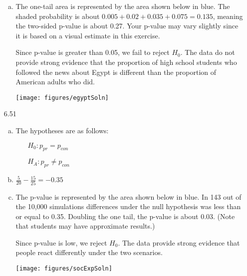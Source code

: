\documentclass[11pt]{article}
\begin{document}
\begin{enumerate}
\begin{enumerate}[(a)]
\item The one-tail area is represented by the area shown below in blue. The shaded probability is about $0.005 + 0.02 + 0.035 + 0.075 = 0.135$, meaning the two-sided p-value is about 0.27. Your p-value may vary slightly since it is based on a visual estimate in this exercise.

\begin{minipage}[c]{0.5\textwidth}
Since p-value is greater than 0.05, we fail to reject $H_0$. The data do not provide strong evidence that the proportion of high school students who followed the news about Egypt is different than the proportion of American adults who did. 
\end{minipage}
\begin{minipage}[c]{0.5\textwidth}
\begin{center}
\texttt{[image: figures/egyptSoln]}
\end{center}
\end{minipage}
\end{enumerate}

%

\item[6.51]
\begin{enumerate}[(a)]
\item The hypotheses are as follows:
\begin{itemize}
\item[] $H_0: p_{pr} = p_{con}$
\item[] $H_A: p_{pr} \ne p_{con}$
\end{itemize}

\item $\frac{5}{20} - \frac{15}{25} = -0.35$
\item The p-value is represented by the area shown below in blue. In 143 out of the 10,000 simulations differences under the null hypothesis was less than or equal to 0.35. Doubling the one tail, the p-value is about 0.03. (Note that students may have approximate results.)

\noindent \begin{minipage}[c]{0.5\textwidth}
Since p-value is low, we reject $H_0$. The data provide strong evidence that people react differently under the two scenarios.
\end{minipage}
\begin{minipage}[c]{0.5\textwidth}
\begin{center}
\texttt{[image: figures/socExpSoln]}
\end{center}
\end{minipage}
\end{enumerate}

\end{enumerate}
\end{document}

